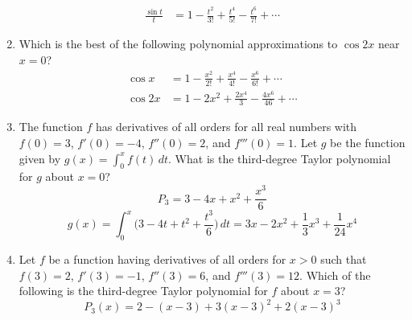 \documentclass[12pt]{article}
\begin{document}
\begin{enumerate}
\begin{align*}
	      	\frac{\sin t}{t} & = \boxed{1 - \frac{t^2}{3!} + \frac{t^4}{5!} - \frac{t^6}{7!} + \cdots} 
	      \end{align*}
	\item Which is the best of the following polynomial approximations to $\cos 2x$ near $x = 0$?
	      \begin{align*}
	      	\cos x  & = 1 - \frac{x^2}{2!} + \frac{x^4}{4!} - \frac{x^6}{6!} + \cdots \\
	      	\cos 2x & = \boxed{1 - 2x^2} + \frac{2x^4}{3} - \frac{4x^6}{46} + \cdots  
	      \end{align*}
	\item The function $f$ has derivatives of all orders for all real numbers with $f(0) = 3$, $f'(0) = -4$, $f''(0) = 2$, and $f'''(0) = 1$. Let $g$ be the function given by $g(x)=\int_{0}^{x}f(t) \, dt$. What is the third-degree Taylor polynomial for $g$ about $x = 0$?
	      $$P_{3} = 3-4x+x^2 + \frac{x^3}{6}$$
	      $$g(x) = \int_{0}^{x} \Big( 3-4t+t^2 + \frac{t^3}{6}\Big) \, dt = \boxed{3x-2x^2+ \frac{1}{3}x^3} + \frac{1}{24}x^4$$
	\item Let $f$ be a function having derivatives of all orders for $x>0$ such that $f(3)=2$, $f'(3)=-1$, $f''(3)=6$, and $f'''(3)=12$. Which of the following is the third-degree Taylor polynomial for $f$ about $x=3$?
	      $$\boxed{P_{3}(x) = 2-(x-3)+3(x-3)^2+2(x-3)^3}$$
\end{enumerate}
\end{document}
